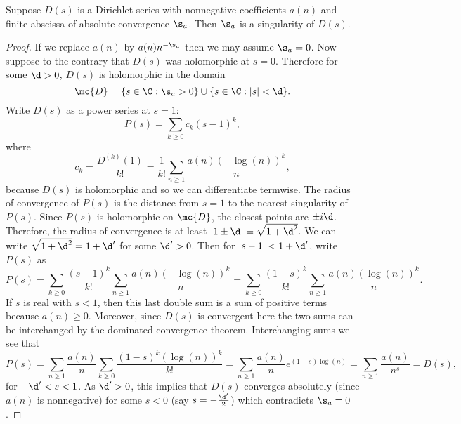     \begin{theorem}
      Suppose $D(s)$ is a Dirichlet series with nonnegative coefficients $a(n)$ and finite abscissa of absolute convergence $\s_{a}$. Then $\s_{a}$ is a singularity of $D(s)$.
    \end{theorem}
    \begin{proof}
      If we replace $a(n)$ by $a(n)n^{-\s_{a}}$ then we may assume $\s_{a} = 0$. Now suppose to the contrary that $D(s)$ was holomorphic at $s = 0$. Therefore for some $\d > 0$, $D(s)$ is holomorphic in the domain
      \[
        \mc{D} = \{s \in \C:\s_{a} > 0\} \cup \{s \in \C:|s| < \d\}.
      \]
      Write $D(s)$ as a power series at $s = 1$:
      \[
        P(s) = \sum_{k \ge 0}c_{k}(s-1)^{k},
      \]
      where
      \[
        c_{k} = \frac{D^{(k)}(1)}{k!} = \frac{1}{k!}\sum_{n \ge 1}\frac{a(n)(-\log(n))^{k}}{n},
      \]
      because $D(s)$ is holomorphic and so we can differentiate termwise. The radius of convergence of $P(s)$ is the distance from $s = 1$ to the nearest singularity of $P(s)$. Since $P(s)$ is holomorphic on $\mc{D}$, the closest points are $\pm i\d$. Therefore, the radius of convergence is at least $|1\pm\d| = \sqrt{1+\d^{2}}$. We can write $\sqrt{1+\d^{2}} = 1+\d'$ for some $\d' > 0$. Then for $|s-1| < 1+\d'$, write $P(s)$ as
      \[
        P(s) = \sum_{k \ge 0}\frac{(s-1)^{k}}{k!}\sum_{n \ge 1}\frac{a(n)(-\log(n))^{k}}{n} = \sum_{k \ge 0}\frac{(1-s)^{k}}{k!}\sum_{n \ge 1}\frac{a(n)(\log(n))^{k}}{n}.
      \]
      If $s$ is real with $s < 1$, then this last double sum is a sum of positive terms because $a(n) \ge 0$. Moreover, since $D(s)$ is convergent here the two sums can be interchanged by the dominated convergence theorem. Interchanging sums we see that
      \[
        P(s) = \sum_{n \ge 1}\frac{a(n)}{n}\sum_{k \ge 0}\frac{(1-s)^{k}(\log(n))^{k}}{k!} = \sum_{n \ge 1}\frac{a(n)}{n}e^{(1-s)\log(n)} = \sum_{n \ge 1}\frac{a(n)}{n^{s}} = D(s),
      \]
      for $-\d' < s < 1$. As $\d' > 0$, this implies that $D(s)$ converges absolutely (since $a(n)$ is nonnegative) for some $s < 0$ (say $s = -\frac{\d'}{2}$) which contradicts $\s_{a} = 0$.
    \end{proof}

